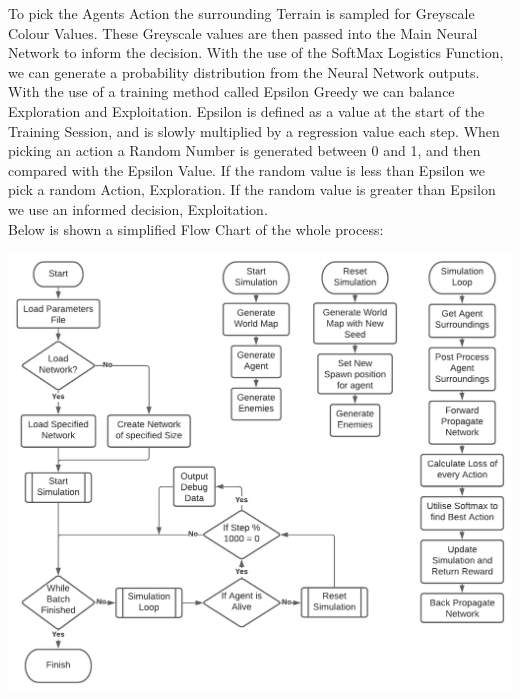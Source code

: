 \begin{flushleft}
            To pick the Agents Action the surrounding Terrain is sampled for Greyscale Colour Values. These Greyscale values are then 
            passed into the Main Neural Network to inform the decision. With the use of the SoftMax Logistics Function, we can generate a 
            probability distribution from the Neural Network outputs. \\
            \vspace{0.2cm}
            With the use of a training method called Epsilon Greedy we can balance Exploration and Exploitation. Epsilon is defined as
            a value at the start of the Training Session, and is slowly multiplied by a regression value each step. When picking an action
            a Random Number is generated between 0 and 1, and then compared with the Epsilon Value. If the random value is less than Epsilon
            we pick a random Action, Exploration. If the random value is greater than Epsilon we use an informed decision, Exploitation. \\
            \vspace{0.2cm}
            Below is shown a simplified Flow Chart of the whole process: \\
            
            \vspace{0.5cm}
            \centerline{\includegraphics[width=\textwidth]{Images/Design/NEAFlowChart.png}}
            \vspace{0.5cm}

\end{flushleft}
